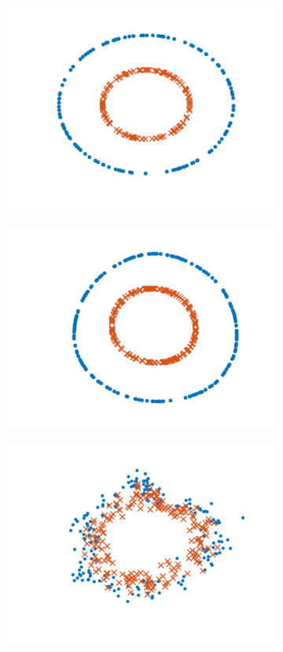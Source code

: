\documentclass[letterpaper]{article} %
\begin{document}
\begin{figure}[ht]

\centering
\begin{subfigure}[b]{0.38\columnwidth}
\centering
{\includegraphics[width=0.85\columnwidth]{circleLatentEmbedding_groundTruth.png}}
\caption{}
\label{subfig:circleTrain}
\end{subfigure}
\begin{subfigure}[b]{0.38\columnwidth}
\centering
{\includegraphics[width=0.85\columnwidth]{circleLatentEmbedding_AE.png}}
\caption{}
\label{subfig:circleLatent}
\end{subfigure}
\begin{subfigure}[b]{0.38\columnwidth}
\centering
\includegraphics[width=0.85\columnwidth]{circleLatentEmbedding_vae.png}

\end{subfigure}
\end{figure}
\end{document}
